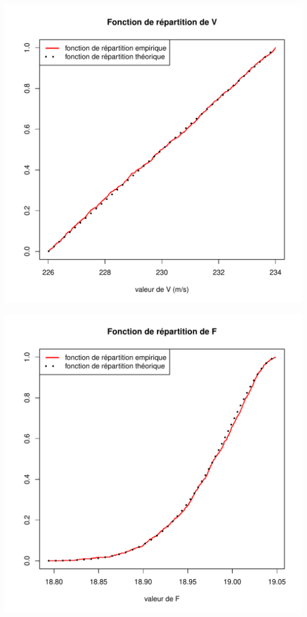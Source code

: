 \documentclass{book}
\begin{document}
\begin{center}
\includegraphics[scale=0.7]{V_fctrep.pdf}
\end{center}\begin{center}
\includegraphics[scale=0.7]{F_fctrep.pdf}

\end{center}
\end{document}
